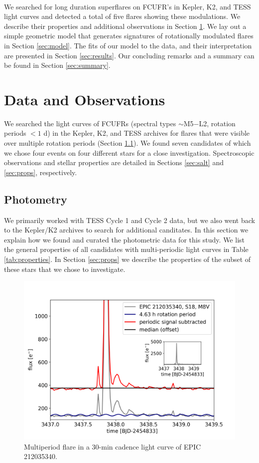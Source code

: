 \documentclass[fleqn,usenatbib,letters]{mnras}%
\newcommand{\FD}{EPIC 212035340} %
\begin{document}
\\
We searched for long duration superflares on FCUFR's in Kepler, K2, and TESS light curves and detected a total of five flares showing these modulations. We describe their properties and additional observations in Section \ref{sec:data}. We lay out a simple geometric model that generates signatures of rotationally modulated flares in Section \ref{sec:model}. The fits of our model to the data, and their interpretation are presented in Section \ref{sec:results}. Our concluding remarks and a summary can be found in Section \ref{sec:summary}.
\section{Data and Observations}
\label{sec:data}
We searched the light curves of FCUFRs (spectral types $\sim$M5$-$L2, rotation periods $< 1$ d) in the Kepler, K2, and TESS archives for flares that were visible over multiple rotation periods (Section \ref{sec:photometry}). We found seven candidates of which we chose four events on four different stars for a close investigation. Spectroscopic observations and stellar properties are detailed in Sections \ref{sec:salt} and \ref{sec:props}, respectively.

\subsection{Photometry}
\label{sec:photometry}
We primarily worked with TESS Cycle 1 and Cycle 2 data, but we also went back to the Kepler/K2 archives to search for additional canditates. In this section we explain how we found and curated the photometric data for this study. We list the general properties of all candidates with multi-periodic light curves in Table \ref{tab:properties}. In Section \ref{sec:props} we describe the properties of the subset of these stars that we chose to investigate.
\begin{figure}
	\includegraphics[width=\columnwidth]{figures/EPIC212035340_inset.png}
    \caption{Multiperiod flare in a 30-min cadence light curve of \FD.}
    \label{fig:\FD}
\end{figure}
\end{document}
